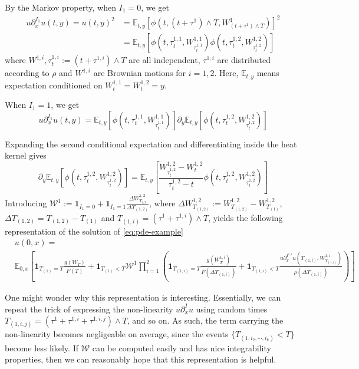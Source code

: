 \documentclass[11pt]{article}
\theoremstyle{definition}
\theoremstyle{remark}
\begin{document}
By the Markov property, when $I_1 = 0$, we get
 \begin{align*}
	 u \partial_x ^{I_1} u (t,y) = u(t,y) ^{2} &= \mathbb E _{t,y} \left[ \phi(t, (t + \tau ^{1}) \wedge T, W ^{1}_{(t + \tau ^{1}) \wedge T}) \right]^{2} \\
						   & = \mathbb E _{t,y} \left[ \phi(t, \tau ^{1,1}_{t}, W ^{1,1}_{\tau _{t} ^{1,1}}) \phi(t, \tau ^{1,2}_{t}, W ^{1,2}_{\tau _{t} ^{1,2}}) \right]
 \end{align*}
 where $W ^{1,i}, \tau ^{1,i}_t := (t + \tau ^{1,i}) \wedge T$ are all independent, $\tau ^{1,i}$ are distributed according to $\rho$ and $W ^{1,i}$ are Brownian motions for $i = 1,2$. Here, $\mathbb E _{t,y}$ means expectation conditioned on $W_t ^{1,1} = W_t ^{1,2} = y$.

 When $I_1 = 1$, we get 
 \[
	 u \partial_x ^{I_1} u (t,y) = \mathbb E _{t,y} \left[ \phi(t,\tau ^{1,1}_{t}, W ^{1,1}_{\tau ^{1,1}_{t}}) \right] \partial _{y} \mathbb E _{t,y} \left[\phi(t,\tau ^{1,2}_{t}, W ^{1,2}_{\tau ^{1,2}_{t}}) \right]
 \]

 Expanding the second conditional expectation and differentiating inside the heat kernel gives
 \[
	 \partial_y \mathbb E _{t,y} \left[ \phi(t,\tau ^{1,2}_{t}, W ^{1,2}_{\tau ^{1,2}_{t}}) \right] = \mathbb E _{t,y} \left[\frac{W ^{1,2}_{\tau ^{1,2}_t} - W ^{1,2}_{t}}{\tau ^{1,2}_{t} - t} \phi(t,\tau ^{1,2}_{t}, W ^{1,2}_{\tau ^{1,2}_{t}}) \right]
 \]
 Introducing $\mathcal W ^{1} := \mathbf{1} _{I_1 = 0} + \mathbf{1} _{I_1 = 1} \frac{\Delta W _{T _{1,2}}^{1,2}}{\Delta T _{(1,2)}}$, where $\Delta W ^{1,2}_{T _{(1,2)}}:= W ^{1,2}_{T _{(1,2)}} - W ^{1,2}_{T _{(1)}}$, $\Delta T _{(1,2)} = T _{(1,2)} - T _{(1)}$ and $T _{(1,i)} = (\tau ^{1} + \tau ^{1,i}) \wedge T$, yields the following representation of the solution of \eqref{eq:pde-example}
\begin{equation}
    \label{eq:intro-ex-branching-rep}
    \begin{aligned}
    &u(0,x) = \\ &\mathbb E _{0,x} \left[ \mathbf{1} _{T _{(1)} = T} \frac{g(W_T)}{\overline{F}(T)} + \mathbf{1} _{T _{(1)} < T} \mathcal W ^{1}  \prod _{i = 1}^{2} \left( \mathbf{1} _{T _{(1,i)} = T} \frac{g(W _{T}^{1,i})}{\overline{F}(\Delta T _{(1,i)})} + \mathbf{1} _{T _{(1,i)} < T} \frac{u \partial_x ^{I ^{1,i}} u (T _{(1,i)}, W ^{1,i}_{T _{(1,i)}})}{\rho(\Delta T _{(1,i)})} \right) \right]
\end{aligned}
\end{equation}

One might wonder why this representation is interesting. Essentially, we can repeat the trick of expressing the non-linearity $u \partial_x ^{I} u$ using random times $T _{(1,i,j)} = (\tau ^{1} + \tau ^{1,i} + \tau ^{1,i,j})\wedge T$, and so on. As such, the term carrying the non-linearity becomes negligeable on average, since the events $\{T _{(1,i_2,\cdots,i_k)} < T \}$ become less likely. If $\mathcal W$ can be computed easily and has nice integrability properties, then we can reasonably hope that this representation is helpful.
\end{document}
